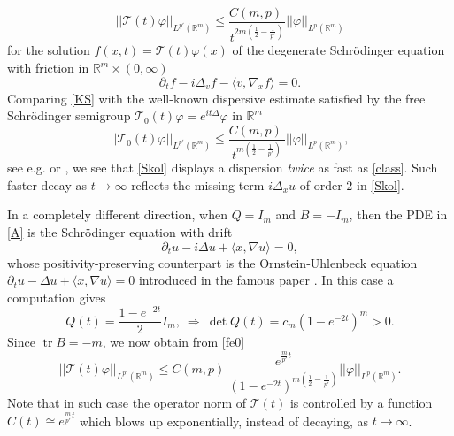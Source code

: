 \documentclass[11pt,a4paper]{amsart}
\def \vf{\varphi}
\newcommand{\Rm}{\mathbb R^m}
\newcommand{\p}{\partial}
\numberwithin{equation}{section}
\newcommand{\tr}{\operatorname{tr}}
\newcommand{\sa}{\langle}
\newcommand{\da}{\rangle}
\numberwithin{equation}{section}
\begin{document}
\begin{equation}\label{KS}
||\mathcal T(t) \vf||_{L^{p'}(\Rm)} \le \frac{C(m,p)\ }{t^{2m(\frac 12 - \frac 1{p'})}} ||\vf||_{L^p(\Rm)}
\end{equation}
for the solution $f(x,t) = \mathcal T(t) \vf(x)$ of the degenerate Schr\"odinger equation with friction in $\Rm\times (0,\infty)$
\begin{equation}\label{Skol}
\p_t f- i \Delta_v f - \sa v,\nabla_x f\da = 0.
\end{equation}
Comparing \eqref{KS} with the well-known dispersive estimate satisfied by the free Schr\"odinger semigroup $\mathcal T_0(t) \vf = e^{i t \Delta} \vf$ in $\Rm$
\begin{equation}\label{class}
||\mathcal T_0(t) \vf||_{L^{p'}(\Rm)} \le \frac{C(m,p)\ }{t^{m(\frac 12 - \frac 1{p'})}} ||\vf||_{L^p(\Rm)},
\end{equation}
see e.g. \cite[Lemma 1.2]{GV} or \cite[Proposition 2.2.3]{Caze},
we see that \eqref{Skol} displays a dispersion \emph{twice} as fast as \eqref{class}. Such faster decay as $t\to \infty$ reflects the missing term $i \Delta_x u$ of order $2$ in \eqref{Skol}. 

In a completely different direction, when $Q = I_m$ and $B = - I_m$, then the PDE in \eqref{A} is  the Schr\"odinger equation with drift
\begin{equation}\label{OU}
\p_t u - i \Delta u + \sa x,\nabla u\da = 0,
\end{equation}
whose positivity-preserving counterpart is  
the Ornstein-Uhlenbeck equation $\p_t u - \Delta u +
\langle x,\nabla u\rangle  = 0$ introduced in the famous paper \cite{OU}. In this case a computation gives
\[
Q(t) = \frac{1-e^{-2t}}{2} I_m,\ \Longrightarrow\ \det Q(t) = c_m (1-e^{-2t})^m > 0.
\]
Since $\tr B = - m$, we now obtain from \eqref{fe0}
\begin{equation}\label{feOU}
||\mathcal T(t) \vf||_{L^{p'}(\Rm)} \le C(m,p)\ \frac{e^{\frac{m}{p'} t}}{(1-e^{-2t})^{m(\frac 12 - \frac 1{p'})}} ||\vf||_{L^p(\Rm)}.
\end{equation}
Note that in such case the operator norm of $\mathcal T(t)$ is controlled by a function $C(t) \cong e^{\frac{m}{p'} t}$ which blows up exponentially, instead of decaying, as $t\to \infty$. 
\end{document}
